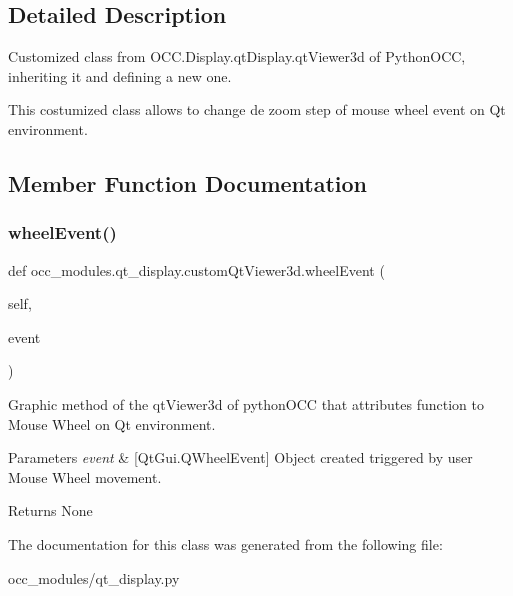 \subsection{Detailed Description}
Customized class from O\+C\+C.\+Display.\+qt\+Display.\+qt\+Viewer3d of Python\+O\+CC, inheriting it and defining a new one. 

This costumized class allows to change de zoom step of mouse wheel event on Qt environment. 

\subsection{Member Function Documentation}
\hypertarget{a00093_a2031b7d19b3a0c4b0f54fc90218bcdd8}{}\label{a00093_a2031b7d19b3a0c4b0f54fc90218bcdd8} 
\subsubsection{\texorpdfstring{wheel\+Event()}{wheelEvent()}}
{\footnotesize\ttfamily def occ\+\_\+modules.\+qt\+\_\+display.\+custom\+Qt\+Viewer3d.\+wheel\+Event (\begin{DoxyParamCaption}\item[{}]{self,  }\item[{}]{event }\end{DoxyParamCaption})}



Graphic method of the qt\+Viewer3d of python\+O\+CC that attributes function to Mouse Wheel on Qt environment. 


\begin{DoxyParams}{Parameters}
{\em event} & \mbox{[}Qt\+Gui.\+Q\+Wheel\+Event\mbox{]} Object created triggered by user Mouse Wheel movement. \\
\hline
\end{DoxyParams}
\begin{DoxyReturn}{Returns}
None 
\end{DoxyReturn}


The documentation for this class was generated from the following file\+:\begin{DoxyCompactItemize}
\item 
occ\+\_\+modules/qt\+\_\+display.\+py\end{DoxyCompactItemize}

